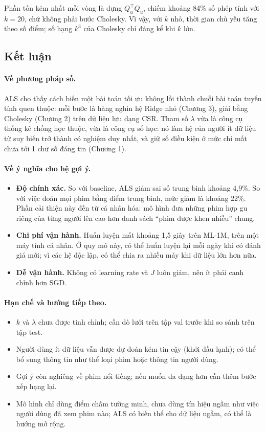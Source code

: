 Phần tốn kém nhất mỗi vòng là dựng $Q_u^\top Q_u$, chiếm khoảng 84\% số phép tính với $k = 20$, chứ không
phải bước Cholesky. Vì vậy, với $k$ nhỏ, thời gian chủ yếu tăng theo số điểm; số hạng $k^3$ của Cholesky
chỉ đáng kể khi $k$ lớn.

\subsection{Kết luận}

\paragraph{Về phương pháp số.}
ALS cho thấy cách biến một bài toán tối ưu không lồi thành chuỗi bài toán tuyến tính quen thuộc: mỗi bước
là hàng nghìn hệ Ridge nhỏ (Chương 3), giải bằng Cholesky (Chương 2) trên dữ liệu lưu dạng CSR. Tham số
$\lambda$ vừa là công cụ thống kê chống học thuộc, vừa là công cụ số học: nó làm hệ của người ít dữ liệu
từ suy biến trở thành có nghiệm duy nhất, và giữ số điều kiện ở mức chỉ mất chưa tới 1 chữ số đáng tin
(Chương 1).

\paragraph{Về ý nghĩa cho hệ gợi ý.}
\begin{itemize}
  \item \textbf{Độ chính xác.} So với baseline, ALS giảm sai số trung bình khoảng 4,9\%. So với việc
        đoán mọi phim bằng điểm trung bình, mức giảm là khoảng 22\%. Phần cải thiện này đến từ cá nhân
        hóa: mô hình đưa những phim hợp gu riêng của từng người lên cao hơn danh sách ``phim được khen
        nhiều'' chung.
  \item \textbf{Chi phí vận hành.} Huấn luyện mất khoảng 1,5 giây trên ML-1M, trên một máy tính cá nhân.
        Ở quy mô này, có thể huấn luyện lại mỗi ngày khi có đánh giá mới; vì các hệ độc lập, có thể chia ra nhiều máy khi dữ liệu lớn hơn nữa.
  \item \textbf{Dễ vận hành.} Không có learning rate và $J$ luôn giảm, nên ít phải canh chỉnh hơn SGD.
\end{itemize}

\paragraph{Hạn chế và hướng tiếp theo.}
\begin{itemize}
  \item $k$ và $\lambda$ chưa được tinh chỉnh; cần dò lưới trên tập val trước khi so sánh trên tập test.
  \item Người dùng ít dữ liệu vẫn được dự đoán kém tin cậy (khởi đầu lạnh); có thể bổ sung thông tin như
        thể loại phim hoặc thông tin người dùng.
  \item Gợi ý còn nghiêng về phim nổi tiếng; nếu muốn đa dạng hơn cần thêm bước xếp hạng lại.
  \item Mô hình chỉ dùng điểm chấm tường minh, chưa dùng tín hiệu ngầm như việc người dùng đã xem phim
        nào; ALS có biến thể cho dữ liệu ngầm, có thể là hướng mở rộng.
\end{itemize}

